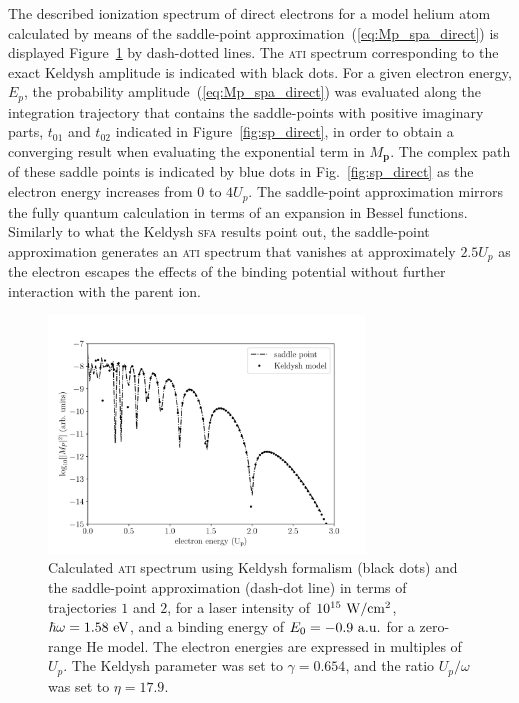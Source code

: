 The described ionization spectrum of direct electrons for a model
helium atom calculated by means of the saddle-point
approximation~(\ref{eq:Mp_spa_direct}) is displayed
Figure~\ref{fig:ati_direct} by dash-dotted lines. The \textsc{ati}
spectrum corresponding to the exact Keldysh amplitude is indicated
with black dots. For a given electron energy, $E_{p}$, the probability
amplitude~(\ref{eq:Mp_spa_direct}) was evaluated along the integration
trajectory that contains the saddle-points with positive imaginary
parts, $t_{01}$ and $t_{02}$ indicated in Figure~\ref{fig:sp_direct},
in order to obtain a converging result when evaluating the exponential
term in $M_{\mathbf{p}}$. The complex path of these saddle points is
indicated by blue dots in Fig.~\ref{fig:sp_direct} as the electron
energy increases from $0$ to $4 U_{p}$. The saddle-point approximation
mirrors the fully quantum calculation in terms of an expansion in
Bessel functions. Similarly to what the Keldysh \textsc{sfa} results
point out, the saddle-point approximation generates an \textsc{ati}
spectrum that vanishes at approximately $2.5 U_{p}$ as the electron
escapes the effects of the binding potential without further
interaction with the parent ion.

\begin{figure}
  \centering
  \includegraphics[width = 0.75\textwidth]{figures/ch_ATI_SPA/direct/SPvsKeldysh}
  \caption{Calculated \textsc{ati} spectrum using Keldysh formalism
    (black dots) and the saddle-point approximation (dash-dot line) in
    terms of trajectories $1$ and $2$, for a laser intensity of
    $10^{15}\ \rm{W/cm^{2}}$, $\hbar\omega = 1.58\ \rm{eV}$, and a
    binding energy of $E_{0} = -0.9\ \rm{a.u.}$ for a zero-range He
    model. The electron energies are expressed in multiples of
    $U_{p}$. The Keldysh parameter was set to $\gamma = 0.654$, and
    the ratio $U_{p}/\omega$ was set to $\eta = 17.9$.}
  \label{fig:ati_direct}
\end{figure}


